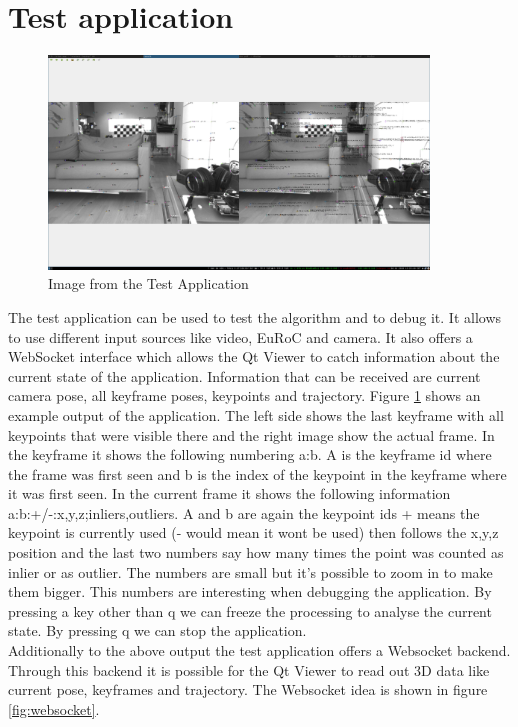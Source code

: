 \documentclass[11pt,a4paper,titlepage,oneside]{report}
\begin{document}
\section{Test application}

\begin{figure}[H]
  \includegraphics[width=0.9\textwidth]{img/test_app.png}
  \caption{Image from the Test Application}\label{fig:test_app}
\end{figure}

The test application can be used to test the algorithm and to debug it. It allows to use different input sources like video, EuRoC and camera. It also offers a WebSocket interface which allows the Qt Viewer to catch information about the current state of the application. Information that can be received are current camera pose, all keyframe poses, keypoints and trajectory. Figure \ref{fig:test_app} shows an example output of the application. The left side shows the last keyframe with all keypoints that were visible there and the right image show the actual frame. In the keyframe it shows the following numbering a:b. A is the keyframe id where the frame was first seen and b is the index of the keypoint in the keyframe where it was first seen. In the current frame it shows the following information a:b:+/-:x,y,z;inliers,outliers. A and b are again the keypoint ids + means the keypoint is currently used (- would mean it wont be used) then follows the x,y,z position and the last two numbers say how many times the point was counted as inlier or as outlier. The numbers are small but it's possible to zoom in to make them bigger. This numbers are interesting when debugging the application. By pressing a key other than q we can freeze the processing to analyse the current state. By pressing q we can stop the application.\\
Additionally to the above output the test application offers a Websocket \cite{websocket} backend. Through this backend it is possible for the Qt Viewer to read out 3D data like current pose, keyframes and trajectory. The Websocket idea is shown in figure \ref{fig:websocket}.
\end{document}
